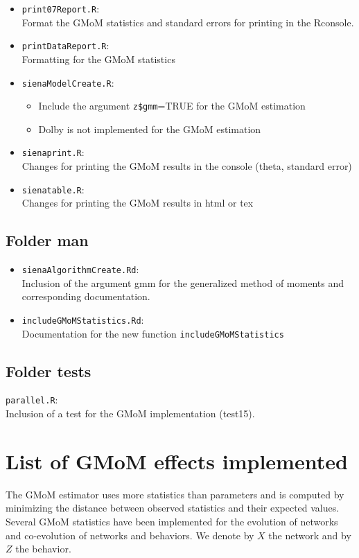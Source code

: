 \documentclass[a4paper,11pt]{article}
\begin{document}
\begin{itemize}
\item \texttt{print07Report.R}:\\
Format the GMoM statistics and standard errors for printing in the Rconsole.

\item \texttt{printDataReport.R}:\\
Formatting for the GMoM statistics

\item \texttt{sienaModelCreate.R}:
\begin{itemize}
	\item Include the argument \texttt{z\$gmm}=TRUE for the GMoM estimation
	\item Dolby is not implemented for the GMoM estimation
\end{itemize}

\item \texttt{sienaprint.R}:\\
Changes for printing the GMoM results in the console (theta, standard error)

\item \texttt{sienatable.R}:\\
Changes for printing the GMoM results in html or tex
\end{itemize}


\subsection*{Folder man}
\begin{itemize}
\item \texttt{sienaAlgorithmCreate.Rd}:\\
Inclusion of the argument gmm for the generalized method of moments and corresponding documentation.
\item \texttt{includeGMoMStatistics.Rd}:\\
Documentation for the new function \texttt{includeGMoMStatistics}
\end{itemize}

\subsection*{Folder tests}
\texttt{parallel.R}:\\
Inclusion of a test for the GMoM implementation (test15).


\section*{List of GMoM effects implemented}
The GMoM estimator uses more statistics than parameters and is computed by minimizing the distance between observed statistics and their expected values. Several GMoM statistics have been implemented for the evolution of networks and co-evolution of networks and behaviors. We denote by $X$ the network and by $Z$ the behavior.
\end{document}
